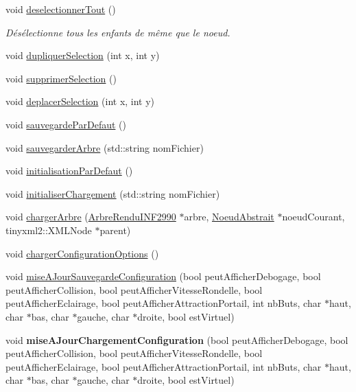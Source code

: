 \begin{DoxyCompactItemize}
void \hyperlink{group__inf2990_ga620c6ede44e1bfec76fe10d5e8477a2a}{deselectionner\+Tout} ()
\begin{DoxyCompactList}\small\item\em Désélectionne tous les enfants de même que le noeud. \end{DoxyCompactList}\item 
void \hyperlink{group__inf2990_gaeb73029786b508340552d920f690953f}{dupliquer\+Selection} (int x, int y)
\item 
void \hyperlink{group__inf2990_ga44bb2e40cdc87d4785d67e5a2dfabf77}{supprimer\+Selection} ()
\item 
void \hyperlink{group__inf2990_ga6dda34af65a0be1b2cc957865b678036}{deplacer\+Selection} (int x, int y)
\item 
void \hyperlink{group__inf2990_ga98b4ad1b668b2c2a56ebfb6a27f89ddd}{sauvegarde\+Par\+Defaut} ()
\item 
void \hyperlink{group__inf2990_ga8a9b90821b4affb5e5513de0ee52bb7b}{sauvegarder\+Arbre} (std\+::string nom\+Fichier)
\item 
void \hyperlink{group__inf2990_gaa6fff338318e965260de66f2dd8a92f5}{initialisation\+Par\+Defaut} ()
\item 
void \hyperlink{group__inf2990_ga75c207d1fd0d48c4eee89cac802e1f52}{initialiser\+Chargement} (std\+::string nom\+Fichier)
\item 
void \hyperlink{group__inf2990_gaa6f0805226a34fc30042c1ebcfb9b54b}{charger\+Arbre} (\hyperlink{class_arbre_rendu_i_n_f2990}{Arbre\+Rendu\+I\+N\+F2990} $\ast$arbre, \hyperlink{class_noeud_abstrait}{Noeud\+Abstrait} $\ast$noeud\+Courant, tinyxml2\+::\+X\+M\+L\+Node $\ast$parent)
\item 
void \hyperlink{group__inf2990_ga96713f5172d7856e11c0ce2b9aee3354}{charger\+Configuration\+Options} ()
\item 
void \hyperlink{group__inf2990_ga8e83945e10401fd01c25a0356aaa467a}{mise\+A\+Jour\+Sauvegarde\+Configuration} (bool peut\+Afficher\+Debogage, bool peut\+Afficher\+Collision, bool peut\+Afficher\+Vitesse\+Rondelle, bool peut\+Afficher\+Eclairage, bool peut\+Afficher\+Attraction\+Portail, int nb\+Buts, char $\ast$haut, char $\ast$bas, char $\ast$gauche, char $\ast$droite, bool est\+Virtuel)
\item 
void {\bfseries mise\+A\+Jour\+Chargement\+Configuration} (bool peut\+Afficher\+Debogage, bool peut\+Afficher\+Collision, bool peut\+Afficher\+Vitesse\+Rondelle, bool peut\+Afficher\+Eclairage, bool peut\+Afficher\+Attraction\+Portail, int nb\+Buts, char $\ast$haut, char $\ast$bas, char $\ast$gauche, char $\ast$droite, bool est\+Virtuel)

\end{DoxyCompactItemize}
